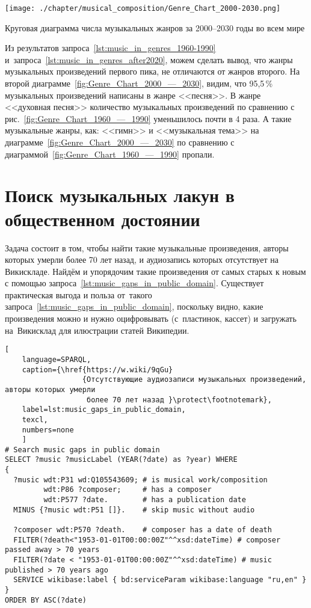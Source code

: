 \begin{marginfigure}[0\baselineskip]
	\texttt{[image: ./chapter/musical\_composition/Genre\_Chart\_2000-2030.png]}
	\caption{Круговая диаграмма числа музыкальных жанров за 2000--2030 годы во всем мире}%
	\label{fig:Genre_Chart_2000_—_2030}%
\end{marginfigure}

Из результатов запроса~\ref{lst:music_in_genres_1960-1990} 
и~запроса~\ref{lst:music_in_genres_after2020}, можем сделать вывод, 
что жанры музыкальных произведений первого пика, не отличаются от жанров второго. 
На второй диаграмме~\ref{fig:Genre_Chart_2000_—_2030}, видим, что 95,5\,\% музыкальных произведений написаны в жанре <<песня>>. В жанре <<духовная песня>> количество музыкальных произведений по сравнению с рис.~\ref{fig:Genre_Chart_1960_—_1990} уменьшилось почти в 4 раза. А такие музыкальные жанры, как: <<гимн>> и <<музыкальная тема>> на диаграмме~\ref{fig:Genre_Chart_2000_—_2030} по сравнению с диаграммой~\ref{fig:Genre_Chart_1960_—_1990} пропали.




\newpage
\section{Поиск музыкальных лакун в общественном достоянии}

Задача состоит в том, чтобы найти такие музыкальные произведения, 
авторы которых умерли более 70 лет назад, 
и аудиозапись которых отсутствует на Викискладе. 
Найдём и упорядочим такие произведения от самых старых к новым 
с помощью запроса~\ref{lst:music_gaps_in_public_domain}. 
Существует практическая выгода и польза от~такого запроса~\ref{lst:music_gaps_in_public_domain}, 
поскольку видно, какие произведения можно и нужно оцифровывать 
(с~пластинок, кассет) и загружать на~Викисклад для илюстрации статей Википедии.

\begin{lstlisting}[ 
    language=SPARQL,
    caption={\href{https://w.wiki/9qGu}
                  {Отсутствующие аудиозаписи музыкальных произведений, авторы которых умерли 
                   более 70 лет назад }\protect\footnotemark},
    label=lst:music_gaps_in_public_domain,
    texcl,
    numbers=none
    ]
# Search music gaps in public domain
SELECT ?music ?musicLabel (YEAR(?date) as ?year) WHERE 
{
  ?music wdt:P31 wd:Q105543609; # is musical work/composition
         wdt:P86 ?composer;     # has a composer
         wdt:P577 ?date.        # has a publication date
  MINUS {?music wdt:P51 []}.	# skip music without audio 
  
  ?composer wdt:P570 ?death.    # composer has a date of death
  FILTER(?death<"1953-01-01T00:00:00Z"^^xsd:dateTime) # composer passed away > 70 years
  FILTER(?date < "1953-01-01T00:00:00Z"^^xsd:dateTime) # music published > 70 years ago
  SERVICE wikibase:label { bd:serviceParam wikibase:language "ru,en" }
}
ORDER BY ASC(?date)
\end{lstlisting}%

